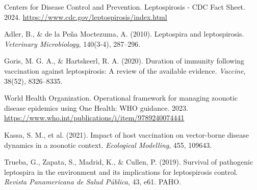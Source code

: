 \documentclass[12pt,a4paper]{article}
\begin{document}
\begin{thebibliography}{9}
Centers for Disease Control and Prevention.
Leptospirosis - CDC Fact Sheet.
2024.
\url{https://www.cdc.gov/leptospirosis/index.html}

Adler, B., \& de la Peña Moctezuma, A. (2010).
Leptospira and leptospirosis.
\textit{Veterinary Microbiology}, 140(3-4), 287--296.

Goris, M. G. A., \& Hartskeerl, R. A. (2020).
Duration of immunity following vaccination against leptospirosis: A review of the available evidence.
\textit{Vaccine}, 38(52), 8326--8335.

World Health Organization.
Operational framework for managing zoonotic disease epidemics using One Health: WHO guidance.
2023.
\url{https://www.who.int/publications/i/item/9789240074441}

Kassa, S. M., et al. (2021).
Impact of host vaccination on vector-borne disease dynamics in a zoonotic context.
\textit{Ecological Modelling}, 455, 109643.

Trueba, G., Zapata, S., Madrid, K., \& Cullen, P. (2019).
Survival of pathogenic leptospira in the environment and its implications for leptospirosis control.
\textit{Revista Panamericana de Salud Pública}, 43, e61. PAHO.


\end{thebibliography}
\end{document}
